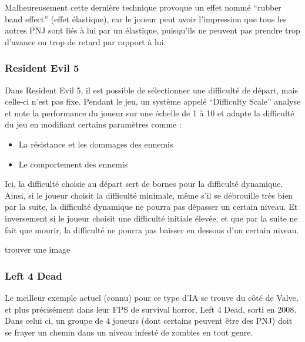 \documentclass[a4paper, 12pt]{article} %
\begin{document}
Malheureusement cette dernière technique provoque un effet nommé “rubber band effect”  (effet élastique), car le joueur peut avoir l’impression que tous les autres PNJ sont liés à lui par un élastique, puisqu’ils ne peuvent pas prendre trop d’avance ou trop de retard par rapport à lui.


\newpage
\subsubsection{Resident Evil 5}

Dans Resident Evil 5, il est possible de sélectionner une difficulté de départ, mais celle-ci n’est pas fixe. Pendant le jeu, un système appelé “Difficulty Scale” analyse et note la performance du joueur sur une échelle de 1 à 10 et adapte la difficulté du jeu en modifiant certains paramètres comme :

\begin{itemize}
	\item La résistance et les dommages des ennemis
	\item Le comportement des ennemis
\end{itemize}

Ici, la difficulté choisie au départ sert de bornes pour la difficulté dynamique. Ainsi, si le joueur choisit la difficulté minimale, même s’il se débrouille très bien par la suite, la difficulté dynamique ne pourra pas dépasser un certain niveau. Et inversement si le joueur choisit une difficulté initiale élevée, et que par la suite ne fait que mourir, la difficulté ne pourra pas baisser en dessous d’un certain niveau.

trouver une image

\newpage
\subsubsection{Left 4 Dead}

Le meilleur exemple actuel (connu) pour ce type d’IA se trouve du côté de Valve, et plus précisément dans leur FPS de survival horror, Left 4 Dead, sorti en 2008. Dans celui ci, un groupe de 4 joueurs (dont certains peuvent être des PNJ) doit se frayer un chemin dans un niveau infesté de zombies en tout genre.
\end{document}
